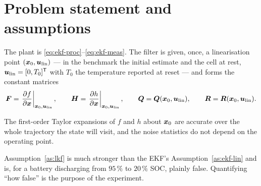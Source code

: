 \section{Problem statement and assumptions}
The plant is \eqref{eq:ekf-proc}--\eqref{eq:ekf-meas}. The filter is given, once, a
linearisation point $(\bm{x}_0,\bm{u}_{\text{lin}})$ --- in the benchmark the initial estimate and
the cell at rest, $\bm{u}_{\text{lin}} = [0, T_0]^{\mathsf{T}}$ with $T_0$ the temperature reported at
reset --- and forms the constant matrices
\begin{equation}
\bm{F} = \left.\frac{\partial f}{\partial\bm{x}}\right|_{\bm{x}_0,\bm{u}_{\text{lin}}}, \qquad
\bm{H} = \left.\frac{\partial h}{\partial\bm{x}}\right|_{\bm{x}_0,\bm{u}_{\text{lin}}}, \qquad
\bm{Q} = \bm{Q}(\bm{x}_0,\bm{u}_{\text{lin}}), \qquad
\bm{R} = \bm{R}(\bm{x}_0,\bm{u}_{\text{lin}}).
\label{eq:lkf-frozen}
\end{equation}
\begin{assumption}\label{as:lkf}
The first-order Taylor expansions of $f$ and $h$ about $\bm{x}_0$ are accurate over the whole
trajectory the state will visit, and the noise statistics do not depend on the operating
point.
\end{assumption}
Assumption~\ref{as:lkf} is much stronger than the EKF's Assumption~\ref{as:ekf-lin} and is,
for a battery discharging from $95\,\%$ to $20\,\%$ SOC, plainly false. Quantifying ``how
false'' is the purpose of the experiment.

